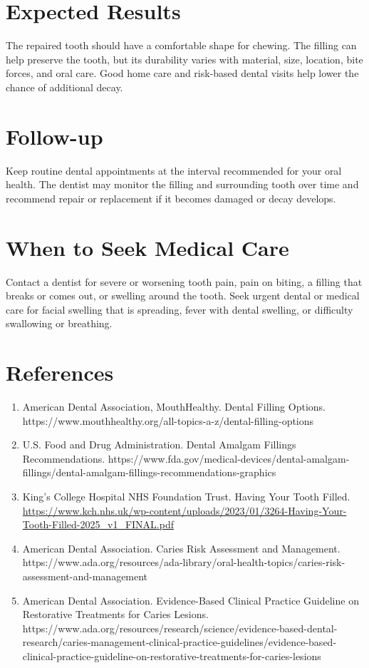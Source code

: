 \section*{Expected Results}
The repaired tooth should have a comfortable shape for chewing. The filling can help preserve the tooth, but its durability varies with material, size, location, bite forces, and oral care. Good home care and risk-based dental visits help lower the chance of additional decay.

\section*{Follow-up}
Keep routine dental appointments at the interval recommended for your oral health. The dentist may monitor the filling and surrounding tooth over time and recommend repair or replacement if it becomes damaged or decay develops.

\section*{When to Seek Medical Care}
Contact a dentist for severe or worsening tooth pain, pain on biting, a filling that breaks or comes out, or swelling around the tooth. Seek urgent dental or medical care for facial swelling that is spreading, fever with dental swelling, or difficulty swallowing or breathing.

\section*{References}
\begin{enumerate}
  \item American Dental Association, MouthHealthy. Dental Filling Options. https://www.mouthhealthy.org/all-topics-a-z/dental-filling-options
  \item U.S. Food and Drug Administration. Dental Amalgam Fillings Recommendations. https://www.fda.gov/medical-devices/dental-amalgam-fillings/dental-amalgam-fillings-recommendations-graphics
  \item King's College Hospital NHS Foundation Trust. Having Your Tooth Filled. \url{https://www.kch.nhs.uk/wp-content/uploads/2023/01/3264-Having-Your-Tooth-Filled-2025_v1_FINAL.pdf}
  \item American Dental Association. Caries Risk Assessment and Management. https://www.ada.org/resources/ada-library/oral-health-topics/caries-risk-assessment-and-management
  \item American Dental Association. Evidence-Based Clinical Practice Guideline on Restorative Treatments for Caries Lesions. https://www.ada.org/resources/research/science/evidence-based-dental-research/caries-management-clinical-practice-guidelines/evidence-based-clinical-practice-guideline-on-restorative-treatments-for-caries-lesions
\end{enumerate}

\clearpage

